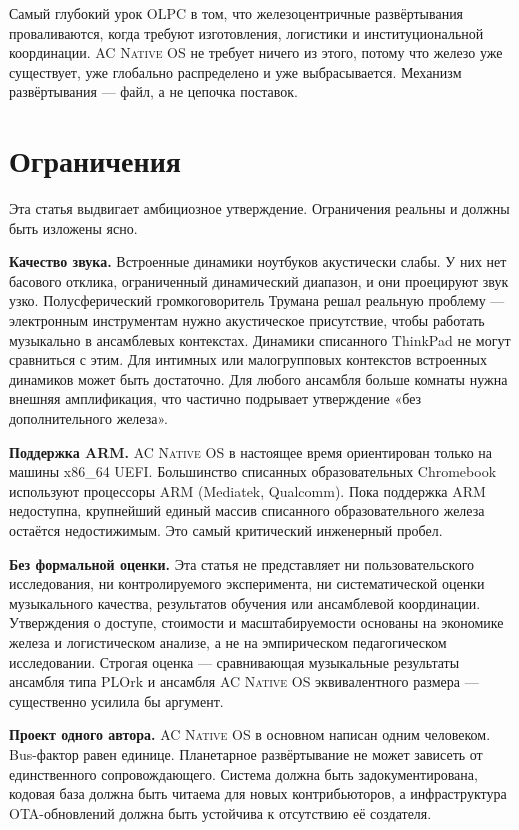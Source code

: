 \documentclass[10pt,letterpaper,twocolumn]{article}
\newcommand{\acos}{\textsc{AC Native OS}}
\begin{document}
Самый глубокий урок OLPC в том, что железоцентричные развёртывания проваливаются, когда требуют изготовления, логистики и институциональной координации. \acos{} не требует ничего из этого, потому что железо уже существует, уже глобально распределено и уже выбрасывается. Механизм развёртывания --- файл, а не цепочка поставок.


\section{Ограничения}
\label{sec:limitations}

Эта статья выдвигает амбициозное утверждение. Ограничения реальны и должны быть изложены ясно.

\textbf{Качество звука.} Встроенные динамики ноутбуков акустически слабы. У них нет басового отклика, ограниченный динамический диапазон, и они проецируют звук узко. Полусферический громкоговоритель Трумана решал реальную проблему --- электронным инструментам нужно акустическое присутствие, чтобы работать музыкально в ансамблевых контекстах. Динамики списанного ThinkPad не могут сравниться с этим. Для интимных или малогрупповых контекстов встроенных динамиков может быть достаточно. Для любого ансамбля больше комнаты нужна внешняя амплификация, что частично подрывает утверждение «без дополнительного железа».

\textbf{Поддержка ARM.} \acos{} в настоящее время ориентирован только на машины x86\_64 UEFI. Большинство списанных образовательных Chromebook используют процессоры ARM (Mediatek, Qualcomm). Пока поддержка ARM недоступна, крупнейший единый массив списанного образовательного железа остаётся недостижимым. Это самый критический инженерный пробел.

\textbf{Без формальной оценки.} Эта статья не представляет ни пользовательского исследования, ни контролируемого эксперимента, ни систематической оценки музыкального качества, результатов обучения или ансамблевой координации. Утверждения о доступе, стоимости и масштабируемости основаны на экономике железа и логистическом анализе, а не на эмпирическом педагогическом исследовании. Строгая оценка --- сравнивающая музыкальные результаты ансамбля типа PLOrk и ансамбля \acos{} эквивалентного размера --- существенно усилила бы аргумент.

\textbf{Проект одного автора.} \acos{} в основном написан одним человеком. Bus-фактор равен единице. Планетарное развёртывание не может зависеть от единственного сопровождающего. Система должна быть задокументирована, кодовая база должна быть читаема для новых контрибьюторов, а инфраструктура OTA-обновлений должна быть устойчива к отсутствию её создателя.
\end{document}

